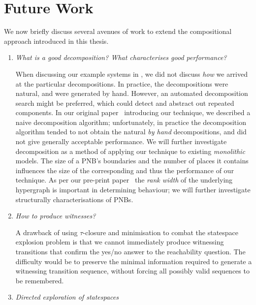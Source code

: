 \section{Future Work}

We now briefly discuss several avenues of work to extend the compositional
approach introduced in this thesis.

\begin{enumerate}[leftmargin=*]
    \item \emph{What is a good decomposition? What characterises good performance?}

        When discussing our example systems in , we did
        not discuss \emph{how} we arrived at the particular decompositions. In
        practice, the decompositions were natural, and were generated by hand.
        However, an automated decomposition search might be preferred, which
        could detect and abstract out repeated components. In our original
        paper~\cite{Sobocinski2013} introducing our technique, we described a
        naive decomposition algorithm; unfortunately, in practice the
        decomposition algorithm tended to not obtain the natural \emph{by hand}
        decompositions, and did not give generally acceptable performance. We
        will further investigate decomposition as a method of applying our
        technique to existing \emph{monolithic} models. The size of a PNB's
        boundaries and the number of places it contains influences the size of
        the corresponding \TNFA{} and thus the performance of our technique. As
        per our pre-print paper~\cite{Rathke2013} the \emph{rank width} of the
        underlying hypergraph is important in determining behaviour; we will
        further investigate structurally characterisations of PNBs.

    \item \emph{How to produce witnesses?}

        A drawback of using $\tau$-closure and minimisation to combat the
        statespace explosion problem is that we cannot immediately produce
        witnessing transitions that confirm the yes/no answer to the
        reachability question. The difficulty would be to preserve the minimal
        information required to generate a witnessing transition sequence,
        without forcing all possibly valid sequences to be remembered.

    \item \emph{Directed exploration of statespaces}


\end{enumerate}
